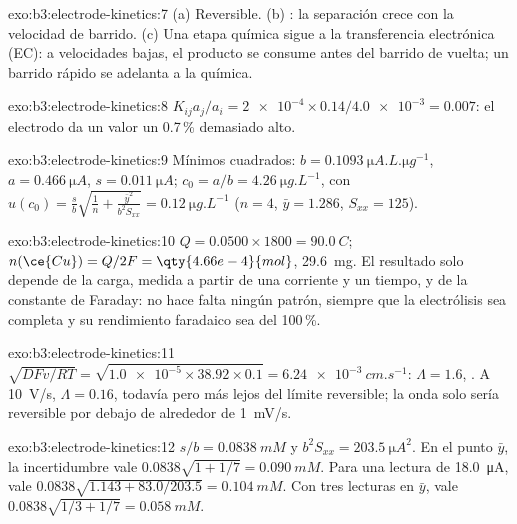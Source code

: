\begin{solution}{exo:b3:electrode-kinetics:7}
(a) Reversible. (b) : la separación crece con la velocidad de barrido.
(c) Una etapa química sigue a la transferencia electrónica (EC): a velocidades bajas, el
producto se consume antes del barrido de vuelta; un barrido rápido se adelanta a la química.
\end{solution}

\begin{solution}{exo:b3:electrode-kinetics:8}
$K_{ij}a_j/a_i = \num{2e-4} \times 0.14/\num{4.0e-3} = 0.007$: el electrodo da un valor un 0.7\,\% demasiado alto.
\end{solution}

\begin{solution}{exo:b3:electrode-kinetics:9}
Mínimos cuadrados: $b = \qty{0.1093}{\micro A.L.\micro g^{-1}}$, $a = \qty{0.466}{\micro A}$, $s = \qty{0.011}{\micro A}$; $c_0 = a/b =
\qty{4.26}{\micro g.L^{-1}}$, con $u(c_0) = \frac sb\sqrt{\frac1n + \frac{\bar y^2}{b^2S_{xx}}} = \qty{0.12}{\micro g.L^{-1}}$
($n = 4$, $\bar y = 1.286$, $S_{xx} = 125$).
\end{solution}

\begin{solution}{exo:b3:electrode-kinetics:10}
$Q = 0.0500 \times 1800 = \qty{90.0}{C}$; $n(\ce{Cu}) = Q/2F = \qty{4.66e-4}{mol}$, \qty{29.6}{mg}. El
resultado solo depende de la carga, medida a partir de una corriente y un tiempo, y de la
constante de Faraday: no hace falta ningún patrón, siempre que la electrólisis sea
completa y su rendimiento faradaico sea del 100\,\%.
\end{solution}

\begin{solution}{exo:b3:electrode-kinetics:11}
$\sqrt{DFv/RT} = \sqrt{\num{1.0e-5} \times 38.92 \times 0.1} = \qty{6.24e-3}{cm.s^{-1}}$: $\Lambda = 1.6$, .
A \qty{10}{V/s}, $\Lambda = 0.16$, todavía  pero más lejos del límite
reversible; la onda solo sería reversible por debajo de alrededor de \qty{1}{mV/s}.
\end{solution}

\begin{solution}{exo:b3:electrode-kinetics:12}
$s/b = \qty{0.0838}{mM}$ y $b^2S_{xx} = \qty{203.5}{\micro A^2}$. En el punto $\bar y$, la incertidumbre vale
$0.0838\sqrt{1 + 1/7} = \qty{0.090}{mM}$. Para una lectura de \qty{18.0}{\micro A}, vale
$0.0838\sqrt{1.143 + 83.0/203.5} = \qty{0.104}{mM}$. Con tres lecturas en $\bar y$, vale
$0.0838\sqrt{1/3 + 1/7} = \qty{0.058}{mM}$.
\end{solution}

